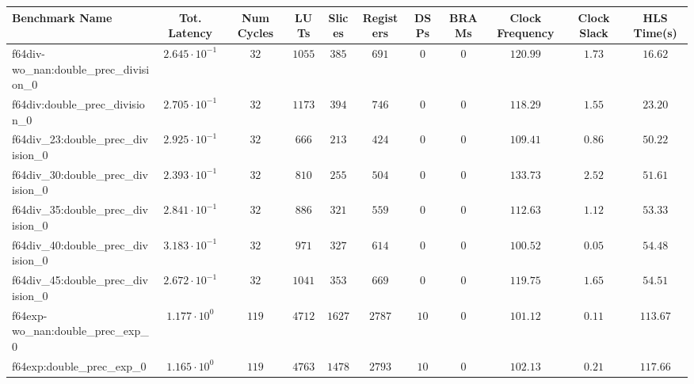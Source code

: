 \begin{tabular}{|l|c|c|c|c|c|c|c|c|c|c|}
\hline
Benchmark Name                                 & Tot. Latency            & Num Cycles & LUTs       & Slices    & Registers & DSPs    & BRAMs & Clock Frequency & Clock Slack & HLS Time(s) \\
\hline
f64div-wo\_nan:double\_prec\_division\_0       & $ 2.645 \cdot 10^{-1} $ & $ 32     $ & $ 1055   $ & $ 385   $ & $ 691   $ & $ 0   $ & $ 0 $ & $ 120.99      $ & $ 1.73    $ & $ 16.62   $ \\
f64div:double\_prec\_division\_0               & $ 2.705 \cdot 10^{-1} $ & $ 32     $ & $ 1173   $ & $ 394   $ & $ 746   $ & $ 0   $ & $ 0 $ & $ 118.29      $ & $ 1.55    $ & $ 23.20   $ \\
f64div\_23:double\_prec\_division\_0           & $ 2.925 \cdot 10^{-1} $ & $ 32     $ & $ 666    $ & $ 213   $ & $ 424   $ & $ 0   $ & $ 0 $ & $ 109.41      $ & $ 0.86    $ & $ 50.22   $ \\
f64div\_30:double\_prec\_division\_0           & $ 2.393 \cdot 10^{-1} $ & $ 32     $ & $ 810    $ & $ 255   $ & $ 504   $ & $ 0   $ & $ 0 $ & $ 133.73      $ & $ 2.52    $ & $ 51.61   $ \\
f64div\_35:double\_prec\_division\_0           & $ 2.841 \cdot 10^{-1} $ & $ 32     $ & $ 886    $ & $ 321   $ & $ 559   $ & $ 0   $ & $ 0 $ & $ 112.63      $ & $ 1.12    $ & $ 53.33   $ \\
f64div\_40:double\_prec\_division\_0           & $ 3.183 \cdot 10^{-1} $ & $ 32     $ & $ 971    $ & $ 327   $ & $ 614   $ & $ 0   $ & $ 0 $ & $ 100.52      $ & $ 0.05    $ & $ 54.48   $ \\
f64div\_45:double\_prec\_division\_0           & $ 2.672 \cdot 10^{-1} $ & $ 32     $ & $ 1041   $ & $ 353   $ & $ 669   $ & $ 0   $ & $ 0 $ & $ 119.75      $ & $ 1.65    $ & $ 54.51   $ \\
f64exp-wo\_nan:double\_prec\_exp\_0            & $ 1.177 \cdot 10^{0}  $ & $ 119    $ & $ 4712   $ & $ 1627  $ & $ 2787  $ & $ 10  $ & $ 0 $ & $ 101.12      $ & $ 0.11    $ & $ 113.67  $ \\
f64exp:double\_prec\_exp\_0                    & $ 1.165 \cdot 10^{0}  $ & $ 119    $ & $ 4763   $ & $ 1478  $ & $ 2793  $ & $ 10  $ & $ 0 $ & $ 102.13      $ & $ 0.21    $ & $ 117.66  $ \\

\end{tabular}
